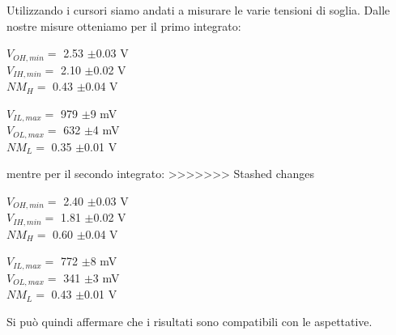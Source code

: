 \documentclass[10pt, a4paper, italian]{article}
\begin{document}
Utilizzando i cursori siamo andati a misurare le varie tensioni di soglia.
Dalle nostre misure otteniamo per il primo integrato:
\begin{multicols}{2}
    \centering
    $V_{OH,min}=$ 2.53 $\pm$0.03 V\\
    $V_{IH,min}=$ 2.10 $\pm$0.02 V\\
    $NM_H=$ 0.43 $\pm$0.04 V
    
    $V_{IL,max}=$ 979 $\pm$9 mV\\
    $V_{OL,max}=$ 632 $\pm$4 mV\\
    $NM_L=$ 0.35 $\pm$0.01 V
\end{multicols}
mentre per il secondo integrato:
>>>>>>> Stashed changes
\begin{multicols}{2}
    \centering
    $V_{OH,min}=$ 2.40 $\pm$0.03 V\\
    $V_{IH,min}=$ 1.81 $\pm$0.02 V\\
    $NM_H=$ 0.60 $\pm$0.04 V
    
    $V_{IL,max}=$ 772 $\pm$8 mV\\
    $V_{OL,max}=$ 341 $\pm$3 mV\\
    $NM_L=$ 0.43 $\pm$0.01 V
\end{multicols}
Si può quindi affermare che i risultati sono compatibili con le aspettative.
\end{document}
